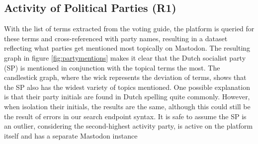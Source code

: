 \subsection{Activity of Political Parties (R1)}
With the list of terms extracted from the voting guide, the platform is queried for these terms and cross-referenced with party names, resulting in a dataset reflecting what parties get mentioned most topically on Mastodon.
The resulting graph in figure \ref{fig:partymentions} makes it clear that the Dutch socialist party (SP) is mentioned in conjunction with the topical terms the most.
The candlestick graph, where the wick represents the deviation of terms, shows that the SP also has the widest variety of topics mentioned.
One possible explanation is that their party initials are found in Dutch spelling quite commonly.
However, when isolation their initials, the results are the same, although this could still be the result of errors in our search endpoint syntax.
It is safe to assume the SP is an outlier, considering the second-highest activity party, is active on the platform itself and has a separate Mastodon instance

